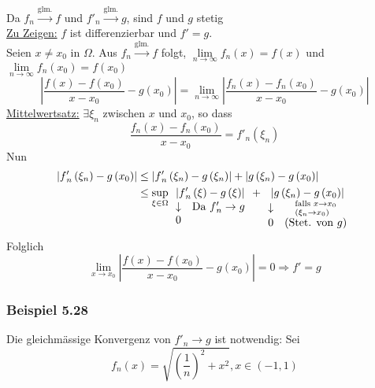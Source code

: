 \begin{beweis}{}
Da ${f_n}\mathop  \to \limits^{\text{glm.}} f$ und ${f'_n}\mathop  \to \limits^{\text{glm.}} g$, sind $f$ und $g$ stetig\\
\underline{Zu Zeigen:} $f$ ist differenzierbar und $f'=g$.\\

Seien $x\not=x_0$ in $\Omega$. Aus ${f_n}\mathop  \to \limits^{\text{glm.}} f$ folgt, $\mathop {\lim }\limits_{n \to \infty } {f_n}\left( x \right) = f\left( x \right)$ und $\mathop {\lim }\limits_{n \to \infty } {f_n}\left( {{x_0}} \right) = f\left( {{x_0}} \right)$
\[\left| {\frac{{f\left( x \right) - f\left( {{x_0}} \right)}}{{x - {x_0}}} - g\left( {{x_0}} \right)} \right| = \mathop {\lim }\limits_{n \to \infty } \left| {\frac{{{f_n}\left( x \right) - {f_n}\left( {{x_0}} \right)}}{{x - {x_0}}} - g\left( {{x_0}} \right)} \right|\]
\underline{Mittelwertsatz:} $\exists\xi_n$ zwischen $x$ und $x_0$, so dass
\[\frac{{{f_n}\left( x \right) - {f_n}\left( {{x_0}} \right)}}{{x - {x_0}}} = f{'_n}\left( {{\xi _n}} \right)\]
Nun
\begin{align*}
\left| {f{'_n}\left( {{\xi _n}} \right) - g\left( {{x_0}} \right)} \right| &\le \left| {f{'_n}\left( {{\xi _n}} \right) - g\left( {{\xi _n}} \right)} \right| + \left| {g\left( {{\xi _n}} \right) - g\left( {{x_0}} \right)} \right|\\
 &\le \mathop {\sup }\limits_{\xi  \in \Omega } \mathop {\left| {f{'_n}\left( \xi  \right) - g\left( \xi  \right)} \right|}\limits_{\begin{array}{*{20}{c}}
 \downarrow &{{\text{Da }}f{'_n} \to g}\\
0&{}
\end{array}}  + \mathop {\left| {g\left( {{\xi _n}} \right) - g\left( {{x_0}} \right)} \right|}\limits_{\begin{array}{*{20}{c}}
 \downarrow &{\scriptstyle{\text{falls }}x \to {x_0}\hfill\atop
\scriptstyle\left( {{\xi _n} \to {x_0}} \right)\hfill}\\
0&{({\text{Stet. von }}g)}
\end{array}}
\end{align*}
Folglich
\[\mathop {\lim }\limits_{x \to {x_0}} \left| {\frac{{f\left( x \right) - f\left( {{x_0}} \right)}}{{x - {x_0}}} - g\left( {{x_0}} \right)} \right| = 0 \Rightarrow f' = g\]
\end{beweis}

\subsubsection*{Beispiel 5.28}
Die gleichmässige Konvergenz von $f'_n\to g$ ist notwendig: Sei
\[{f_n}\left( x \right) = \sqrt {{{\left( {\frac{1}{n}} \right)}^2} + {x^2}} ,x \in \left( { - 1,1} \right)\]
